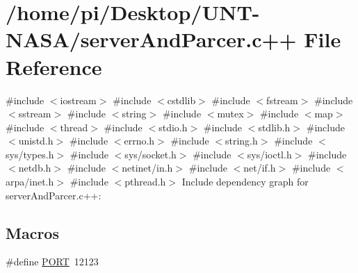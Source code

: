 \hypertarget{serverAndParcer_8c_09_09}{}\section{/home/pi/\+Desktop/\+U\+N\+T-\/\+N\+A\+S\+A/server\+And\+Parcer.c++ File Reference}
\label{serverAndParcer_8c_09_09}
{\ttfamily \#include $<$iostream$>$}\newline
{\ttfamily \#include $<$cstdlib$>$}\newline
{\ttfamily \#include $<$fstream$>$}\newline
{\ttfamily \#include $<$sstream$>$}\newline
{\ttfamily \#include $<$string$>$}\newline
{\ttfamily \#include $<$mutex$>$}\newline
{\ttfamily \#include $<$map$>$}\newline
{\ttfamily \#include $<$thread$>$}\newline
{\ttfamily \#include $<$stdio.\+h$>$}\newline
{\ttfamily \#include $<$stdlib.\+h$>$}\newline
{\ttfamily \#include $<$unistd.\+h$>$}\newline
{\ttfamily \#include $<$errno.\+h$>$}\newline
{\ttfamily \#include $<$string.\+h$>$}\newline
{\ttfamily \#include $<$sys/types.\+h$>$}\newline
{\ttfamily \#include $<$sys/socket.\+h$>$}\newline
{\ttfamily \#include $<$sys/ioctl.\+h$>$}\newline
{\ttfamily \#include $<$netdb.\+h$>$}\newline
{\ttfamily \#include $<$netinet/in.\+h$>$}\newline
{\ttfamily \#include $<$net/if.\+h$>$}\newline
{\ttfamily \#include $<$arpa/inet.\+h$>$}\newline
{\ttfamily \#include $<$pthread.\+h$>$}\newline
Include dependency graph for server\+And\+Parcer.\+c++\+:
\subsection*{Macros}
\begin{DoxyCompactItemize}
\item 
\#define \hyperlink{serverAndParcer_8c_09_09_a614217d263be1fb1a5f76e2ff7be19a2}{P\+O\+RT}~12123
\end{DoxyCompactItemize}

